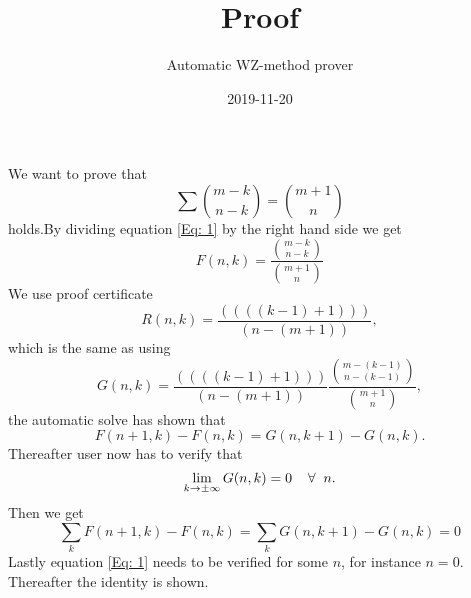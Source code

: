 \documentclass{article}
\title{Proof}
\author{Automatic WZ-method prover}
\date{2019-11-20}
\let\oldforall\forall
\renewcommand{\forall}{\hspace*{2mm}\oldforall\hspace*{1mm}}
\begin{document}
\maketitle
We want to prove that
\begin{equation}\label{Eq: 1}
\sum \binom{m-k}{n-k} = \binom{m+1}{n}
\end{equation}
holds.By dividing equation \ref{Eq: 1} by the right hand side we get
\begin{equation}
F(n,k)=\frac{\binom{m-k}{n-k}}{\binom{m+1}{n}}
\end{equation}
We use proof certificate
\begin{equation}
R(n,k)=\frac{((((k-1)+1)))}{(n-(m+1))},
\end{equation}
which is the same as using
\begin{equation}
G(n,k)=\frac{((((k-1)+1)))}{(n-(m+1))}\frac{\binom{m-(k-1)}{n-(k-1)}}{\binom{m+1}{n}},
\end{equation}
the automatic solve has  shown that
\begin{equation}\label{Eq: WZ1}
F(n+1,k)-F(n,k)=G(n,k+1)-G(n,k).
\end{equation}
Thereafter user now has to verify that
\begin{equation}
\lim_{k\to\pm\infty}G(n,k)=0\forall n.
\end{equation}
Then we get
\begin{equation}
\sum_k F(n+1,k)-F(n,k)=\sum_k G(n,k+1)-G(n,k)=0\end{equation}Lastly equation \ref{Eq: 1} needs to be verified for some $n$, for instance $n=0$. Thereafter the identity is shown.
\end{document}
